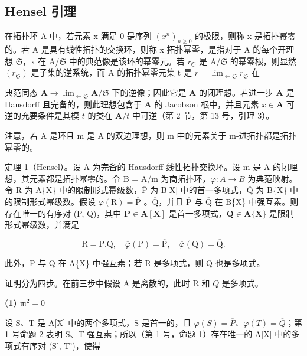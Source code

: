 \subsection{Hensel 引理}

在拓扑环 A 中，若元素 x 满足 0 是序列 \((x^{n})_{n\geqslant0}\) 的极限，则称 x 是拓扑幂零的。若 A 是具有线性拓扑的交换环，则称 x 拓扑幂零，是指对于 A 的每个开理想 \(\mathfrak{S}\)，x 在 A/\(\mathfrak{S}\) 中的典范像是该环的幂零元。若 \(r_{\mathfrak{S}}\) 是 A/\(\mathfrak{S}\) 的幂零根，则显然 \((r_{\mathfrak{S}})\) 是子集的逆系统，而 A 的拓扑幂零元集 t 是 \(r=\lim_{\leftarrow \mathfrak{S}}r_{\mathfrak{S}}\) 在

典范同态 \(\mathbf{A} \to \lim_{\leftarrow \mathfrak{S}} \mathbf{A} / \mathfrak{S}\) 下的逆像；因此它是 \(\mathbf{A}\) 的闭理想。若进一步 \(\mathbf{A}\) 是 Hausdorff 且完备的，则此理想包含于 \(\mathbf{A}\) 的 Jacobson 根中，并且元素 \(x \in \mathbf{A}\) 可逆的充要条件是其模 \(t\) 的类在 \(\mathbf{A} / t\) 中可逆（第 2 节，第 13 号，引理 3）。

注意，若 A 是环且 m 是 A 的双边理想，则 m 中的元素关于 m-进拓扑都是拓扑幂零的。

定理 1（Hensel）。设 A 为完备的 Hausdorff 线性拓扑交换环。设 m 是 A 的闭理想，其元素都是拓扑幂零的。令 B = A/m 为商拓扑环，\(\varphi: A \to B\) 为典范映射。令 R 为 A\{X\} 中的限制形式幂级数，\(\overline{\mathrm{P}}\) 为 B{[}X{]} 中的首一多项式，\(\overline{\mathrm{Q}}\) 为 B\{X\} 中的限制形式幂级数。假设 \(\overline{\varphi}(\mathrm{R}) = \overline{\mathrm{P}}\) 。\(\overline{\mathrm{Q}}\)，并且 \(\overline{\mathrm{P}}\) 与 \(\overline{\mathrm{Q}}\) 在 B\{X\} 中强互素。则存在唯一的有序对 (P, Q)，其中 \(\mathbf{P} \in \mathbf{A}[\mathbf{X}]\) 是首一多项式，\(\mathbf{Q} \in \mathbf{A}\{\mathbf{X}\}\) 是限制形式幂级数，并满足

\[
\mathrm{R} = \mathrm{P}. \mathrm{Q}, \quad \overline {{{\varphi}}} (\mathrm{P}) = \overline {{{\mathrm{P}}}}, \quad \overline {{{\varphi}}} (\mathrm{Q}) = \overline {{{\mathrm{Q}}}}.\tag{4}
\]

此外，P 与 Q 在 A\{X\} 中强互素；若 R 是多项式，则 Q 也是多项式。

证明分为四步。在前三步中假设 A 是离散的，此时 R 和 \(\overline{Q}\) 是多项式。

\textbf{(1) \(\mathfrak{m}^2 = 0\)}\par

设 S、T 是 A{[}X{]} 中的两个多项式，S 是首一的，且 \(\overline{\varphi}(S) = \overline{P}\)、\(\overline{\varphi}(T) = \overline{Q}\)；第 1 号命题 2 表明 S、T 强互素；所以（第 1 号，命题 1）存在唯一的 A{[}X{]} 中的多项式有序对 (S', T')，使得

